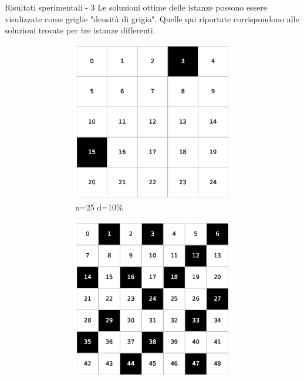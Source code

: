 \documentclass[a4paper]{beamer}
\begin{document}
\begin{frame}{Risultati sperimentali - 3}
Le soluzioni ottime delle istanze possono essere visulizzate come griglie "densità di grigio".
Quelle qui riportate corrispondono alle soluzioni trovate per tre istanze differenti.
\vfill
\begin{figure}[h!]
    \centering
    \begin{subfigure}[b]{\textwidth}
        \centering
        \begin{subfigure}[b]{0.25\textwidth}
            \includegraphics[width=\columnwidth]{images/Tai25c_5x5_10.eps}
			\caption{n=25 d=10\%}
        \end{subfigure}
        \hspace{1em}
        \begin{subfigure}[b]{0.25\textwidth}
            \includegraphics[width=\columnwidth]{images/Tai49c_7x7_30.eps}

\end{subfigure}
\end{subfigure}
\end{figure}
\end{frame}
\end{document}
